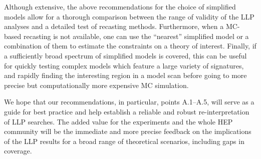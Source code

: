 \noindent
Although extensive, the above recommendations for the choice of simplified
models allow for a thorough comparison between the range of validity of
the LLP analyses and a detailed test of recasting methods.
Furthermore, when a MC-based recasting is not available, one
can use the ``nearest'' simplified model or a combination of them to
estimate the constraints on a theory of interest.
Finally, if a sufficiently broad  spectrum of simplified models is covered, this can
be useful for quickly testing complex models which feature a large variety of signatures,
and rapidly finding the interesting region in a model scan before going to more precise but
computationally more expensive MC simulation.

We hope that our recommendations, in particular, points A.1--A.5, will serve as a guide for best practice and help establish a reliable and robust re-interpretation of LLP searches.
The added value for the experiments and the whole HEP community will be the immediate and more precise feedback on the implications of the LLP results for a broad range of theoretical scenarios, including gaps in coverage.






